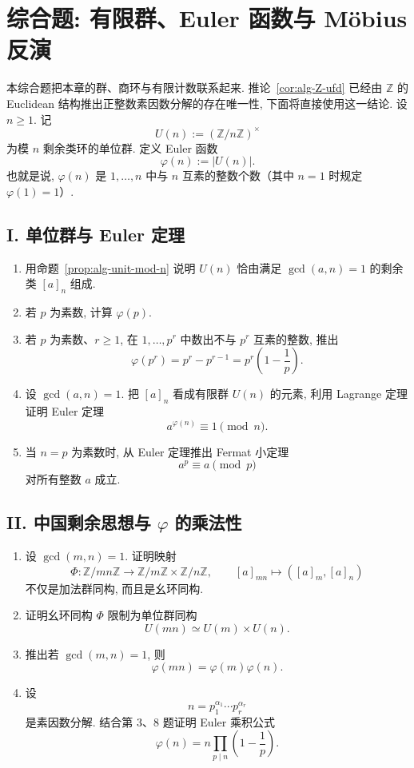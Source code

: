 \documentclass[usesamecnt, thmcnt=section, lang=cn, newtx, 10pt, scheme=chinese]{elegantbook}
\begin{document}
\section{综合题: 有限群、Euler 函数与 Möbius 反演}

本综合题把本章的群、商环与有限计数联系起来. 推论~\ref{cor:alg-Z-ufd} 已经由 $\mathbb Z$ 的 Euclidean 结构推出正整数素因数分解的存在唯一性, 下面将直接使用这一结论. 设 $n\geq1$. 记
\[
 U(n):=(\mathbb Z/n\mathbb Z)^\times
\]
为模 $n$ 剩余类环的单位群. 定义 Euler 函数
\[
 \varphi(n):=|U(n)|.
\]
也就是说, $\varphi(n)$ 是 $1,\ldots,n$ 中与 $n$ 互素的整数个数（其中 $n=1$ 时规定 $\varphi(1)=1$）.

\subsection*{I. 单位群与 Euler 定理}
\begin{enumerate}[label=\textbf{\arabic*.}, series=alg-comp]
  \item 用命题~\ref{prop:alg-unit-mod-n} 说明 $U(n)$ 恰由满足 $\gcd(a,n)=1$ 的剩余类 $[a]_n$ 组成.
  \item 若 $p$ 为素数, 计算 $\varphi(p)$.
  \item 若 $p$ 为素数、$r\geq1$, 在 $1,\ldots,p^r$ 中数出不与 $p^r$ 互素的整数, 推出
  \[
   \varphi(p^r)=p^r-p^{r-1}=p^r\left(1-\frac1p\right).
  \]
  \item 设 $\gcd(a,n)=1$. 把 $[a]_n$ 看成有限群 $U(n)$ 的元素, 利用 Lagrange 定理证明 Euler 定理
  \[
   a^{\varphi(n)}\equiv1\pmod n.
  \]
  \item 当 $n=p$ 为素数时, 从 Euler 定理推出 Fermat 小定理
  \[
   a^p\equiv a\pmod p
  \]
  对所有整数 $a$ 成立.
\end{enumerate}

\subsection*{II. 中国剩余思想与 $\varphi$ 的乘法性}
\begin{enumerate}[label=\textbf{\arabic*.}, resume=alg-comp]
  \item 设 $\gcd(m,n)=1$. 证明映射
  \[
   \Phi:\mathbb Z/mn\mathbb Z
   \longrightarrow
   \mathbb Z/m\mathbb Z\times\mathbb Z/n\mathbb Z,
   \qquad
   [a]_{mn}\longmapsto([a]_m,[a]_n)
  \]
  不仅是加法群同构, 而且是幺环同构.
  \item 证明幺环同构 $\Phi$ 限制为单位群同构
  \[
   U(mn)\simeq U(m)\times U(n).
  \]
  \item 推出若 $\gcd(m,n)=1$, 则
  \[
   \varphi(mn)=\varphi(m)\varphi(n).
  \]
  \item 设
  \[
   n=p_1^{\alpha_1}\cdots p_r^{\alpha_r}
  \]
  是素因数分解. 结合第 3、8 题证明 Euler 乘积公式
  \[
   \varphi(n)
   =n\prod_{p\mid n}\left(1-\frac1p\right).
  \]
\end{enumerate}
\end{document}
